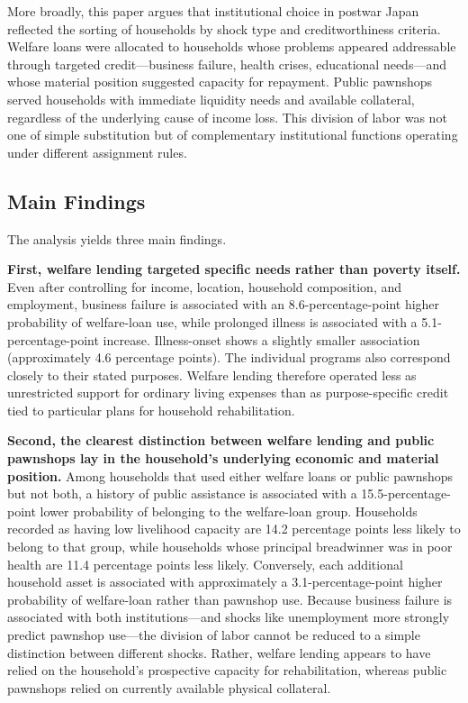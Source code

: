 \documentclass[12pt]{article}
\begin{document}
More broadly, this paper argues that institutional choice in postwar Japan reflected the sorting of households by shock type and creditworthiness criteria. Welfare loans were allocated to households whose problems appeared addressable through targeted credit---business failure, health crises, educational needs---and whose material position suggested capacity for repayment. Public pawnshops served households with immediate liquidity needs and available collateral, regardless of the underlying cause of income loss. This division of labor was not one of simple substitution but of complementary institutional functions operating under different assignment rules.

\subsection{Main Findings}

The analysis yields three main findings.

\textbf{First, welfare lending targeted specific needs rather than poverty itself.} Even after controlling for income, location, household composition, and employment, business failure is associated with an 8.6-percentage-point higher probability of welfare-loan use, while prolonged illness is associated with a 5.1-percentage-point increase. Illness-onset shows a slightly smaller association (approximately 4.6 percentage points). The individual programs also correspond closely to their stated purposes. Welfare lending therefore operated less as unrestricted support for ordinary living expenses than as purpose-specific credit tied to particular plans for household rehabilitation.

\textbf{Second, the clearest distinction between welfare lending and public pawnshops lay in the household's underlying economic and material position.} Among households that used either welfare loans or public pawnshops but not both, a history of public assistance is associated with a 15.5-percentage-point lower probability of belonging to the welfare-loan group. Households recorded as having low livelihood capacity are 14.2 percentage points less likely to belong to that group, while households whose principal breadwinner was in poor health are 11.4 percentage points less likely. Conversely, each additional household asset is associated with approximately a 3.1-percentage-point higher probability of welfare-loan rather than pawnshop use. Because business failure is associated with both institutions---and shocks like unemployment more strongly predict pawnshop use---the division of labor cannot be reduced to a simple distinction between different shocks. Rather, welfare lending appears to have relied on the household's prospective capacity for rehabilitation, whereas public pawnshops relied on currently available physical collateral.
\end{document}
